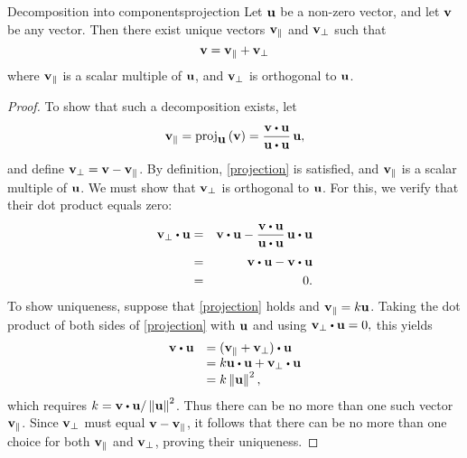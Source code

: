 \begin{theorem}{Decomposition into components}{projection}
  Let $\mbox{\bf u}$ be a non-zero vector, and let $\mbox{\bf v}$ be any
  vector. Then there exist unique vectors $\mbox{\bf v}_{\|}$ and
  $\mbox{\bf v}_{\bot}$ such that
  \begin{equation}\label{projection}
    \mbox{\bf v}=\mbox{\bf v}_{\|}+\mbox{\bf v}_{\bot }  
  \end{equation}
  where $\mbox{\bf v}_{\|}$ is a scalar multiple of $\mbox{\bf u}$, 
  and $\mbox{\bf v}_{\bot}$ is orthogonal to $\mbox{\bf u}$.
\end{theorem}

\begin{proof}
  To show that such a decomposition exists, let
  \begin{equation*}
    \vect{v}_{\coll} = \func{proj}_{\vect{u}}\tup{\vect{v}} = \frac{\vect{v}\dotprod \vect{u}}{\vect{u}\dotprod \vect{u}}\, \vect{u},
  \end{equation*}
  and define $\mbox{\bf v}_{\bot} = \mbox{\bf v}-\mbox{\bf v}_{\|}$. By
  definition, {\eqref{projection}} is satisfied, and
  $\mbox{\bf v}_{\|}$ is a scalar multiple of $\mbox{\bf u}$. We must show
  that $\mbox{\bf v}_{\bot}$ is orthogonal to $\mbox{\bf u}$. For this,  
  we verify that their dot product equals zero:
  \begin{eqnarray*}
    \vect{v}_{\bot }\dotprod \vect{u}
    &=& \vect{v}\dotprod \vect{u}-\frac{\vect{v}\dotprod \vect{u}}{\vect{u}\dotprod\vect{u}}\,\vect{u}\dotprod \vect{u} \\
    &=& \vect{v}\dotprod\vect{u}-\vect{v}\dotprod \vect{u}\\
    &=& 0.
  \end{eqnarray*}
  To show uniqueness, suppose that {\eqref{projection}} holds and
  $\mbox{\bf v}_{\|}= k \mbox{\bf u}$.  Taking the dot product of both
  sides of {\eqref{projection}} with $\mbox{\bf u}$ and using
  $\vect{v}_{\bot }\dotprod \vect{u}=0,$ this yields
  \begin{equation*}
    \begin{array}{ll}
      \vect{v}\dotprod \vect{u} & = ( \vect{v}_{\coll}+\vect{v}_{\bot }) \dotprod \vect{u} \\
                                & =  k\vect{u} \dotprod \vect{u} + \vect{v}_{\bot} \dotprod \vect{u} \\
                                & = k \norm{\vect{u}} ^{2},
    \end{array}
  \end{equation*}
  which requires
  $k =\vect{v}\dotprod \vect{u} / \norm{\vect{u}} ^{2}$.  Thus there
  can be no more than one such vector $\mbox{\bf v}_{\|}$. Since
  $\mbox{\bf v}_{\bot}$ must equal $\mbox{\bf v}-\mbox{\bf v}_{\|}$, it follows
  that there can be no more than one choice for both
  $\mbox{\bf v}_{\|}$ and $\mbox{\bf v}_{\bot}$, proving their uniqueness. 
\end{proof}

